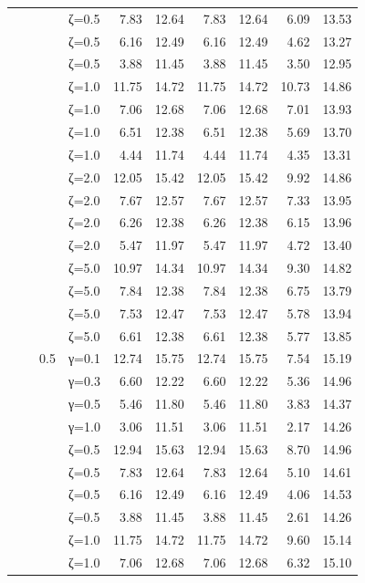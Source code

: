 \begin{table}[htbp]
\begin{tabular}{ll r l  rr  rr  rr}
  &  &  & ζ=0.5 & 7.83 & 12.64 & 7.83 & 12.64 & 6.09 & 13.53 \\
  &  &  & ζ=0.5 & 6.16 & 12.49 & 6.16 & 12.49 & 4.62 & 13.27 \\
  &  &  & ζ=0.5 & 3.88 & 11.45 & 3.88 & 11.45 & 3.50 & 12.95 \\
  &  &  & ζ=1.0 & 11.75 & 14.72 & 11.75 & 14.72 & 10.73 & 14.86 \\
  &  &  & ζ=1.0 & 7.06 & 12.68 & 7.06 & 12.68 & 7.01 & 13.93 \\
  &  &  & ζ=1.0 & 6.51 & 12.38 & 6.51 & 12.38 & 5.69 & 13.70 \\
  &  &  & ζ=1.0 & 4.44 & 11.74 & 4.44 & 11.74 & 4.35 & 13.31 \\
  &  &  & ζ=2.0 & 12.05 & 15.42 & 12.05 & 15.42 & 9.92 & 14.86 \\
  &  &  & ζ=2.0 & 7.67 & 12.57 & 7.67 & 12.57 & 7.33 & 13.95 \\
  &  &  & ζ=2.0 & 6.26 & 12.38 & 6.26 & 12.38 & 6.15 & 13.96 \\
  &  &  & ζ=2.0 & 5.47 & 11.97 & 5.47 & 11.97 & 4.72 & 13.40 \\
  &  &  & ζ=5.0 & 10.97 & 14.34 & 10.97 & 14.34 & 9.30 & 14.82 \\
  &  &  & ζ=5.0 & 7.84 & 12.38 & 7.84 & 12.38 & 6.75 & 13.79 \\
  &  &  & ζ=5.0 & 7.53 & 12.47 & 7.53 & 12.47 & 5.78 & 13.94 \\
  &  &  & ζ=5.0 & 6.61 & 12.38 & 6.61 & 12.38 & 5.77 & 13.85 \\
  &  & 0.5 & γ=0.1 & 12.74 & 15.75 & 12.74 & 15.75 & 7.54 & 15.19 \\
  &  &  & γ=0.3 & 6.60 & 12.22 & 6.60 & 12.22 & 5.36 & 14.96 \\
  &  &  & γ=0.5 & 5.46 & 11.80 & 5.46 & 11.80 & 3.83 & 14.37 \\
  &  &  & γ=1.0 & 3.06 & 11.51 & 3.06 & 11.51 & 2.17 & 14.26 \\
  &  &  & ζ=0.5 & 12.94 & 15.63 & 12.94 & 15.63 & 8.70 & 14.96 \\
  &  &  & ζ=0.5 & 7.83 & 12.64 & 7.83 & 12.64 & 5.10 & 14.61 \\
  &  &  & ζ=0.5 & 6.16 & 12.49 & 6.16 & 12.49 & 4.06 & 14.53 \\
  &  &  & ζ=0.5 & 3.88 & 11.45 & 3.88 & 11.45 & 2.61 & 14.26 \\
  &  &  & ζ=1.0 & 11.75 & 14.72 & 11.75 & 14.72 & 9.60 & 15.14 \\
  &  &  & ζ=1.0 & 7.06 & 12.68 & 7.06 & 12.68 & 6.32 & 15.10 \\

\end{tabular}
\end{table}
